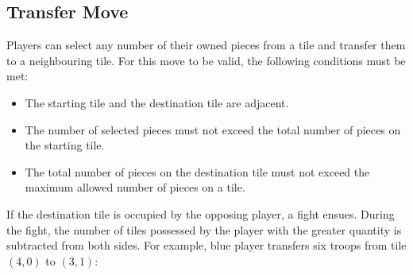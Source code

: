 \documentclass[letterpaper, 12pt]{article}
\begin{document}
\subsection*{Transfer Move}
Players can select any number of their owned pieces from a tile and transfer them to a 
neighbouring tile. For this move to be valid, the following conditions must be met:
\begin{itemize}
  \item The starting tile and the destination tile are adjacent.
  \item The number of selected pieces must not exceed the total number of pieces on the
    starting tile.
  \item The total number of pieces on the destination tile must not exceed the maximum 
    allowed number of pieces on a tile.
\end{itemize}
If the destination tile is occupied by the opposing player, a fight ensues. During the
fight, the number of tiles possessed by the player with the greater quantity is
subtracted from both sides. For example, blue player transfers six troops from tile
\((4, 0)\) to \((3, 1)\):
\end{document}

